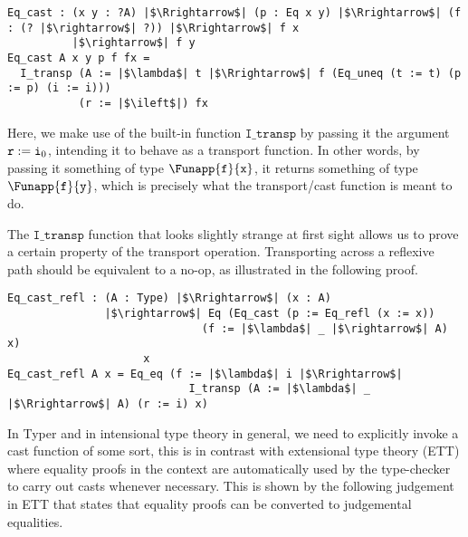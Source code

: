 \documentclass[12pt,twoside,maitrise]{dms}
\theoremstyle{definition}
\numberwithin{equation}{section}
\numberwithin{table}{chapter}
\numberwithin{figure}{chapter}
\newcommand\kw[1] {\textsf{#1}}
\newcommand\id[1] {\texttt{#1}}
\begin{document}
\begin{verbatim}
Eq_cast : (x y : ?A) |$\Rrightarrow$| (p : Eq x y) |$\Rrightarrow$| (f : (? |$\rightarrow$| ?)) |$\Rrightarrow$| f x
          |$\rightarrow$| f y
Eq_cast A x y p f fx =
  I_transp (A := |$\lambda$| t |$\Rrightarrow$| f (Eq_uneq (t := t) (p := p) (i := i)))
           (r := |$\ileft$|) fx
\end{verbatim}

Here, we make use of the built-in function $\id{I\_transp}$ by passing it the
argument $\earg{\id{r}}{\ileft}$, intending it to behave as a transport
function. In other words, by passing it something of type
$\Funapp{\id{f}}{\id{x}}$, it returns something of type
$\Funapp{\id{f}}{\id{y}}$, which is precisely what the transport/cast function
is meant to do.

The $\id{I\_transp}$ function that looks slightly strange at first sight allows
us to prove a certain property of the transport operation. Transporting across a
reflexive path should be equivalent to a no-op, as illustrated in the
following proof.

\begin{verbatim}
Eq_cast_refl : (A : Type) |$\Rrightarrow$| (x : A)
               |$\rightarrow$| Eq (Eq_cast (p := Eq_refl (x := x))
                              (f := |$\lambda$| _ |$\rightarrow$| A) x)
                     x
Eq_cast_refl A x = Eq_eq (f := |$\lambda$| i |$\Rrightarrow$|
                            I_transp (A := |$\lambda$| _ |$\Rrightarrow$| A) (r := i) x)
\end{verbatim}


In Typer and in intensional type theory in general, we need to explicitly invoke
a cast function of some sort, this is in contrast with extensional type theory
(ETT)\cite{martin1982constructive} where equality proofs in the context are
automatically used by the type-checker to carry out casts whenever necessary.
This is shown by the following judgement in ETT that states that equality proofs
can be converted to judgemental equalities.

\begin{prooftree*}
  \hypo{\oftype{\ctx}{t}{\Funapp{\kw{Eq}}{a}{b}}}
\end{prooftree*}
\end{document}
